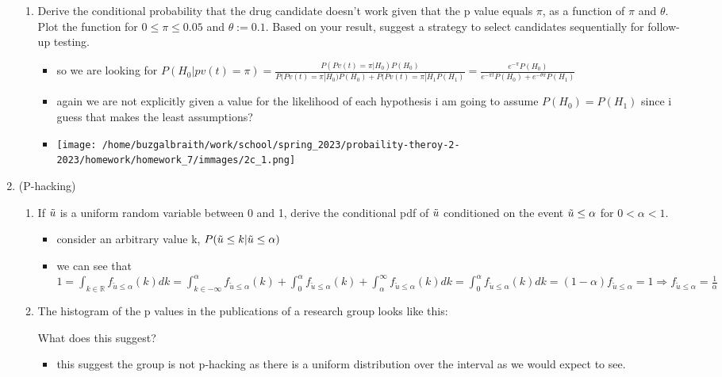 \documentclass[12pt,twoside]{article}
\begin{document}
\begin{enumerate}
\begin{enumerate}
\item Derive the conditional probability that the drug candidate doesn't work given that the p value equals $\pi$, as a function of $\pi$ and $\theta$. Plot the function for $0 \leq \pi \leq 0.05$ and $\theta := 0.1$. Based on your result, suggest a strategy to select candidates sequentially for follow-up testing.
\begin{itemize}
  \color{blue}
  \item so we are looking for $P(H_0|pv(t)=\pi)=\frac{P(Pv(t)=\pi|H_0)P(H_0)}{P(Pv(t)=\pi|H_0)P(H_0)+P(Pv(t)=\pi|H_1P(H_1)}
  =\frac{e^{-\pi }P(H_0)}{e^{-\pi t}P(H_0)+e^{-\theta \pi }P(H_1)} 
  $
  \item again we are not explicitly given a value for the likelihood of each hypothesis i am going to assume $P(H_0)=P(H_1)$ since i guess that makes the least assumptions?
  \item \texttt{[image: /home/buzgalbraith/work/school/spring\_2023/probaility-theroy-2-2023/homework/homework\_7/immages/2c\_1.png]} 
\end{itemize}

\end{enumerate}
\newpage
\item (P-hacking) 
\begin{enumerate}
\item If $\tilde{ u }$ is a uniform random variable between 0 and 1, derive the conditional pdf of $\tilde{ u }$ conditioned on the event $\tilde{ u }\leq \alpha$ for $0 <\alpha < 1$. 
\begin{itemize}
  \color{blue}
  \item consider an arbitrary value k, $P(\Tilde{u}\leq k|\tilde{u}\leq \alpha)$
\item we can see that $1=\int_{k\in \mathbb{R}}f_{\tilde{u}\leq \alpha}(k)dk=\int_{k\in \mathbb{-\infty}}^{\alpha}f_{\tilde{u}\leq \alpha}(k)+\int_{0}^{\alpha}f_{\tilde{u}\leq \alpha}(k)+\int_{\alpha}^{\infty}f_{\tilde{u}\leq \alpha}(k)dk=\int_{0}^{\alpha}f_{\tilde{u}\leq \alpha}(k)dk=(1-\alpha)f_{\tilde{u}\leq \alpha}=1\Rightarrow f_{\tilde{u}\leq \alpha}=\frac{1}{\alpha}$ 
\end{itemize}

\item The histogram of the p values in the publications of a research group looks like this:
\begin{center}
\end{center}
What does this suggest? 
\begin{itemize}
  \color{blue}
  \item this suggest the group is not p-hacking as there is a uniform distribution over the interval as we would expect to see. 
\end{itemize}


\end{enumerate}
\end{enumerate}
\end{document}
